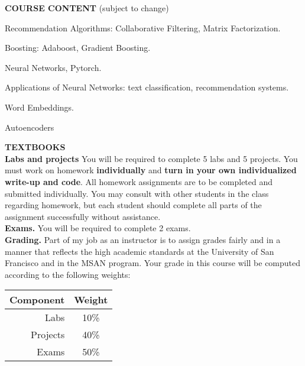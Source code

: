 \documentclass[11pt]{article}
\newenvironment{itemize*}%
  {\begin{itemize}%
    \setlength{\itemsep}{0pt}%
    \setlength{\parskip}{0pt}}%
  {\end{itemize}}
\begin{document}
\noindent \textbf{COURSE CONTENT} (subject to change)

\vspace{-0.05in}

\begin{itemize*}
\item	Recommendation Algorithms: Collaborative Filtering, Matrix Factorization.
\item Boosting: Adaboost, Gradient Boosting.
\item Neural Networks, Pytorch.
\item Applications of Neural Networks: text classification, recommendation systems.
\item Word Embeddings.
\item Autoencoders
\end{itemize*}
\vspace{0.1in}

\noindent \noindent \textbf{TEXTBOOKS} \\



\noindent \textbf{Labs and projects} You will be required to complete 5  labs  and 5 projects. You must work on homework \textbf{individually} and \textbf{turn in your own individualized write-up and code}. All homework assignments are to be completed and submitted individually. You may consult with other students in the class regarding homework, but each student should complete all parts of the assignment successfully without assistance.\\

\noindent \textbf{Exams.} You will be required to complete 2 exams.  \\

\noindent \textbf{Grading.} Part of my job as an instructor is to assign grades fairly and in a manner that reflects the high academic standards at the University of San Francisco and in the MSAN program. Your grade in this course will be computed according to the following weights:\\

\vspace{-0.15in}

\begin{center}
\begin{tabular}{|r|c|}
  \hline
  \textbf{Component} & \textbf{Weight} \\
  \hline
  Labs & 10\% \\
  Projects & 40\% \\
  Exams & 50\%  \\
  \hline
\end{tabular}
\end{center}
\end{document}
